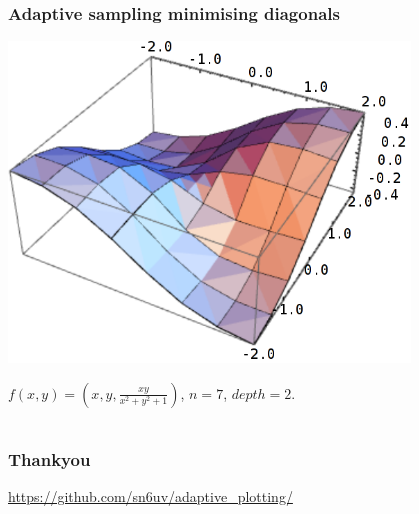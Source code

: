 \documentclass{beamer}
\begin{document}
\begin{frame}
\frametitle{Adaptive sampling minimising diagonals}
\begin{center}
\includegraphics[width=0.8\textwidth]{3Dadaptive.png}
\end{center}
$f(x,y) = \left(x,y, \frac{x y}{x^2 + y^2 + 1}\right)$, $n = 7$, $depth=2$.
\end{frame}

\section*{}
\begin{frame}
\frametitle{Thankyou}
\url{https://github.com/sn6uv/adaptive_plotting/}

\end{frame}
\end{document}
